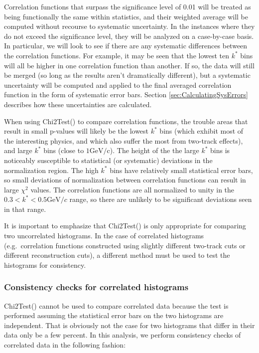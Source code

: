 Correlation functions that surpass the significance level of 0.01 will be treated as being functionally the same within statistics, and their weighted average will be computed without recourse to systematic uncertainty. 
In the instances where they do not exceed the significance level, they will be analyzed on a case-by-case basis.  
In particular, we will look to see if there are any systematic differences between the correlation functions.  
For example, it may be seen that the lowest ten $k^*$ bins will all be higher in one correlation function than another.  
If so, the data will still be merged (so long as the results aren't dramatically different), but a systematic uncertainty will be computed and applied to the final averaged correlation function in the form of systematic error bars.  
Section \ref{sec:CalculatingSysErrors} describes how these uncertainties are calculated.  

When using Chi2Test() to compare correlation functions, the trouble areas that result in small p-values will likely be the lowest $k^*$ bins (which exhibit most of the interesting physics, and which also suffer the most from two-track effects), and large $k^*$ bins (close to $1 \mathrm{GeV/c}$).  
The height of the the large $k^*$ bins is noticeably susceptible to statistical (or systematic) deviations in the normalization region.  
The high $k^*$ bins have relatively small statistical error bars, so small deviations of normalization between correlation functions can result in large $\chi^2$ values.  
The correlation functions are all normalized to unity in the $0.3 < k^* < 0.5 \mathrm{GeV}/c$ range, so there are unlikely to be significant deviations seen in that range.  

It is important to emphasize that Chi2Test() is only appropriate for comparing two uncorrelated histograms.  
In the case of correlated histograms (e.g.\ correlation functions constructed using slightly different two-track cuts or different reconstruction cuts), a different method must be used to test the histograms for consistency.  


\subsubsection{Consistency checks for correlated histograms}
\label{sec:ConsistencyCheckCorrelated}
Chi2Test() cannot be used to compare correlated data because the test is performed assuming the statistical error bars on the two histograms are independent.  
That is obviously not the case for two histograms that differ in their data only be a few percent.  
In this analysis, we perform consistency checks of correlated data in the following fashion:

